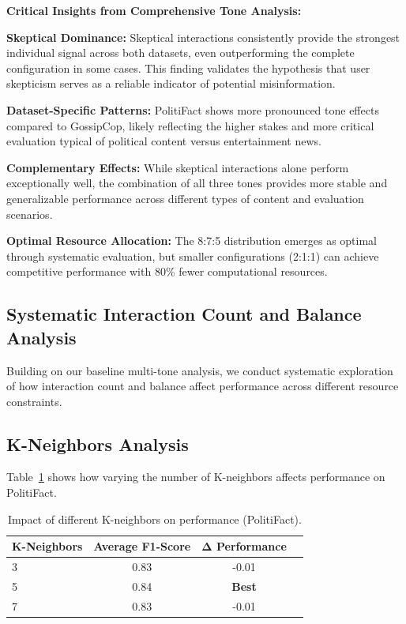 \textbf{Critical Insights from Comprehensive Tone Analysis:}

\textbf{Skeptical Dominance:} Skeptical interactions consistently provide the strongest individual signal across both datasets, even outperforming the complete configuration in some cases. This finding validates the hypothesis that user skepticism serves as a reliable indicator of potential misinformation.

\textbf{Dataset-Specific Patterns:} PolitiFact shows more pronounced tone effects compared to GossipCop, likely reflecting the higher stakes and more critical evaluation typical of political content versus entertainment news.

\textbf{Complementary Effects:} While skeptical interactions alone perform exceptionally well, the combination of all three tones provides more stable and generalizable performance across different types of content and evaluation scenarios.

\textbf{Optimal Resource Allocation:} The 8:7:5 distribution emerges as optimal through systematic evaluation, but smaller configurations (2:1:1) can achieve competitive performance with 80\% fewer computational resources.

\subsection{Systematic Interaction Count and Balance Analysis}

Building on our baseline multi-tone analysis, we conduct systematic exploration of how interaction count and balance affect performance across different resource constraints.

\subsection{K-Neighbors Analysis}

Table~\ref{tab:hyperparameter_k_neighbors_politifact} shows how varying the number of K-neighbors affects performance on PolitiFact.

\begin{table}[htbp]
\centering
\caption{Impact of different K-neighbors on performance (PolitiFact).}
\label{tab:hyperparameter_k_neighbors_politifact}
\begin{tabular}{lccc}
\toprule
\textbf{K-Neighbors} & \textbf{Average F1-Score} & \textbf{Δ Performance} \\
\midrule
3 & 0.83 & -0.01 \\
5 & 0.84 & \textbf{Best} \\
7 & 0.83 & -0.01 \\
\bottomrule
\end{tabular}
\end{table}


